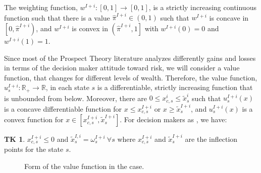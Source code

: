 \documentclass[pdftex]{article}
\numberwithin{equation}{section}
\theoremstyle{th}
\newtheorem{proof lemma}{{Proof Lemma}.}
\theoremstyle{definition}
\newtheorem*{TK}{TK\hspace{-0.15cm}}
\begin{document}
{The weighting function, $w^{I+i}:[0,1]\rightarrow[0,1]$, is a strictly increasing continuous function such that there is a value $\hat{\pi}^{I+i}\in(0,1)$ such that $w^{I+i}$ is concave in $\left[0,\hat{\pi}^{I+i}\right)$, and $w^{I+i}$ is convex in $\left(\hat{\pi}^{I+i},1\right]$ with $w^{I+i}(0)=0$ and $w^{I+i}(1)=1$.



Since most of the Prospect Theory literature analyzes differently gains and losses in terms of the decision maker attitude toward risk, we will consider a value function, that changes for different levels of wealth. Therefore, the value function, ${u^{I+i}_s}:\mathbb{R}_+\rightarrow\mathbb{R}$, in each state $s$ is a differentiable, strictly increasing  function that is unbounded from below. Moreover, there are $0\leq{x}^i_{c,s}\leq\tilde{x}^i_s$ such that ${u^{I+i}_s}(x)$ is a concave differentiable function for $x\leq{x^{I+i}_{c,s}}$ or $x\geq\tilde{x}^{I+i}_s$, and ${u^{I+i}_s}(x)$ is a convex function for $x\in\left[x^{I+i}_{c,s},\tilde{x}^{I+i}_s\right]$. For decision makers as \cite{KT92}, we have:

\begin{TK} $x^{I+i}_{c,s}\leq0$ and $\tilde{x}^{I,i}_s=\omega^{I+i}_s\ \forall{s}$ where $x^{I+i}_{c,s}$ and $\tilde{x}^{I+i}_s$ are the inflection points for the state $s$.
\end{TK}

\begin{figure}[h]
\begin{center}
\end{center}
\caption{Form of the value function in the \cite{KT92} case.}
\end{figure}





}
\end{document}
